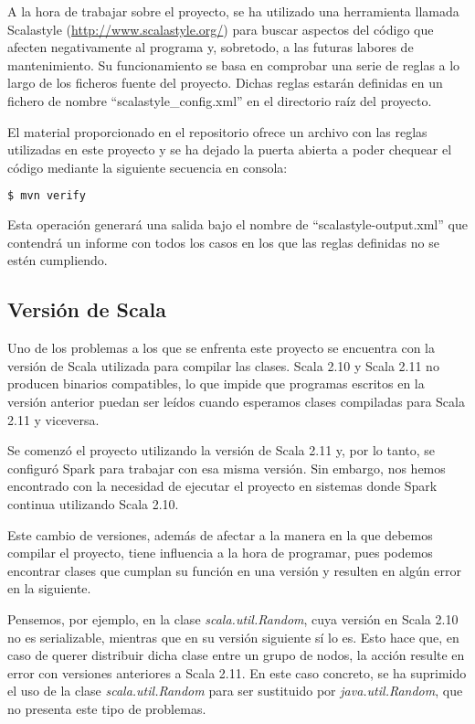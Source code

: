 A la hora de trabajar sobre el proyecto, se ha utilizado una herramienta llamada Scalastyle (\url{http://www.scalastyle.org/}) para buscar aspectos del código que afecten negativamente al programa y, sobretodo, a las futuras labores de mantenimiento. Su funcionamiento se basa en comprobar una serie de reglas a lo largo de los ficheros fuente del proyecto. Dichas reglas estarán definidas en un fichero de nombre ``scalastyle\_config.xml'' en el directorio raíz del proyecto.

El material proporcionado en el repositorio ofrece un archivo con las reglas utilizadas en este proyecto y se ha dejado la puerta abierta a poder chequear el código mediante la siguiente secuencia en consola:

\begin{lstlisting}[language=bash]
$ mvn verify
\end{lstlisting}

Esta operación generará una salida bajo el nombre de ``scalastyle-output.xml'' que contendrá un informe con todos los casos en los que las reglas definidas no se estén cumpliendo.

\subsection{Versión de Scala}

Uno de los problemas a los que se enfrenta este proyecto se encuentra con la versión de Scala utilizada para compilar las clases. Scala 2.10 y Scala 2.11 no producen binarios compatibles, lo que impide que programas escritos en la versión anterior puedan ser leídos cuando esperamos clases compiladas para Scala 2.11 y viceversa.

Se comenzó el proyecto utilizando la versión de Scala 2.11 y, por lo tanto, se configuró Spark para trabajar con esa misma versión. Sin embargo, nos hemos encontrado con la necesidad de ejecutar el proyecto en sistemas donde Spark continua utilizando Scala 2.10.

Este cambio de versiones, además de afectar a la manera en la que debemos compilar el proyecto, tiene influencia a la hora de programar, pues podemos encontrar clases que cumplan su función en una versión y resulten en algún error en la siguiente. 

Pensemos, por ejemplo, en la clase \textit{scala.util.Random}, cuya versión en Scala 2.10 no es serializable, mientras que en su versión siguiente sí lo es. Esto hace que, en caso de querer distribuir dicha clase entre un grupo de nodos, la acción resulte en error con versiones anteriores a Scala 2.11. En este caso concreto, se ha suprimido el uso de la clase \textit{scala.util.Random} para ser sustituido por \textit{java.util.Random}, que no presenta este tipo de problemas.

